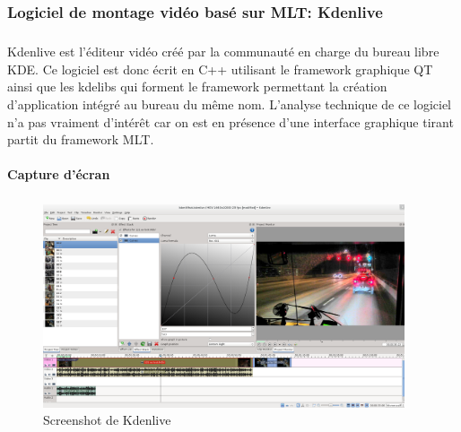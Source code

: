 \subsubsection {Logiciel de montage vidéo basé sur MLT: Kdenlive}

\subparagraph{}

Kdenlive est l'éditeur vidéo créé par la communauté en charge
du bureau libre KDE. Ce logiciel est donc écrit en C++ utilisant le
framework graphique QT  ainsi que les kdelibs qui forment le framework
permettant la création d'application intégré au bureau du même nom.
L'analyse technique de ce logiciel n'a pas vraiment d'intérêt car on
est en présence d'une interface graphique tirant partit du framework MLT.

\paragraph {Capture d'écran}

\subparagraph{}

\begin{figure}[H]

  \begin{center}

    \includegraphics[width=0.95\textwidth]{images/kdenlive}

  \end{center}

  \caption{Screenshot de Kdenlive}

  \label{Yes}

\end{figure}

